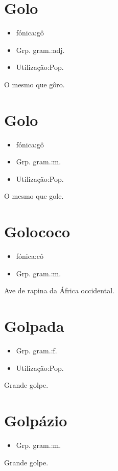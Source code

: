 \section{Golo}
\begin{itemize}
\item {fónica:gô}
\end{itemize}
\begin{itemize}
\item {Grp. gram.:adj.}
\end{itemize}
\begin{itemize}
\item {Utilização:Pop.}
\end{itemize}
O mesmo que \textunderscore gôro\textunderscore .
\section{Golo}
\begin{itemize}
\item {fónica:gô}
\end{itemize}
\begin{itemize}
\item {Grp. gram.:m.}
\end{itemize}
\begin{itemize}
\item {Utilização:Pop.}
\end{itemize}
O mesmo que \textunderscore gole\textunderscore .
\section{Golococo}
\begin{itemize}
\item {fónica:cô}
\end{itemize}
\begin{itemize}
\item {Grp. gram.:m.}
\end{itemize}
Ave de rapina da África occidental.
\section{Golpada}
\begin{itemize}
\item {Grp. gram.:f.}
\end{itemize}
\begin{itemize}
\item {Utilização:Pop.}
\end{itemize}
Grande golpe.
\section{Golpázio}
\begin{itemize}
\item {Grp. gram.:m.}
\end{itemize}
Grande golpe.
